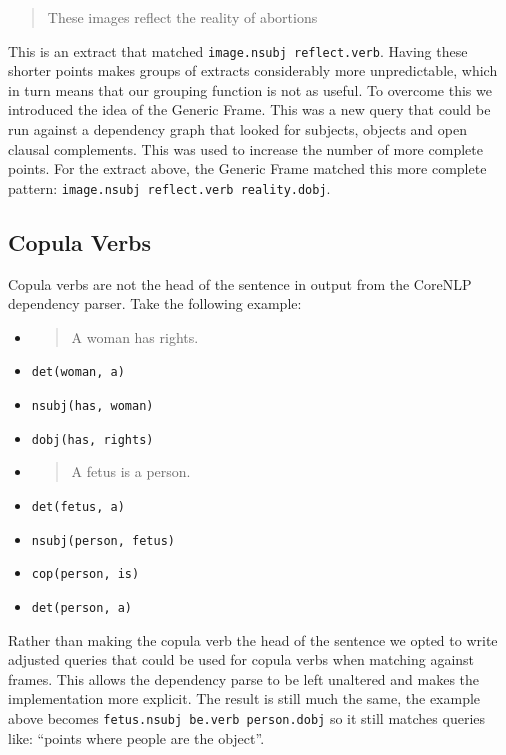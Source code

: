       \blockquote{These images reflect the reality of abortions}

      This is an extract that matched \texttt{image.nsubj reflect.verb}. Having these shorter points makes groups of extracts considerably more unpredictable, which in turn means that our grouping function is not as useful. To overcome this we introduced the idea of the Generic Frame. This was a new query that could be run against a dependency graph that looked for subjects, objects and open clausal complements. This was used to increase the number of more complete points. For the extract above, the Generic Frame matched this more complete pattern: \texttt{image.nsubj reflect.verb reality.dobj}.

    \tocless\subsection{Copula Verbs}
      Copula verbs are not the head of the sentence in output from the CoreNLP dependency parser. Take the following example:
      \begin{multicols}{2}
        \raggedcolumns
        \begin{itemize}[label={}]
          \item{\blockquote{A woman has rights.}}
          \item{\texttt{det(woman, a)}}
          \item{\texttt{nsubj(has, woman)}}
          \item{\texttt{dobj(has, rights)}}
        \end{itemize}
        \columnbreak
        \begin{itemize}[label={}]
          \item{\blockquote{A fetus is a person.}}
          \item{\texttt{det(fetus, a)}}
          \item{\texttt{nsubj(person, fetus)}}
          \item{\texttt{cop(person, is)}}
          \item{\texttt{det(person, a)}}
        \end{itemize}
      \end{multicols}

      Rather than making the copula verb the head of the sentence we opted to write adjusted queries that could be used for copula verbs when matching against frames. This allows the dependency parse to be left unaltered and makes the implementation more explicit. The result is still much the same, the example above becomes \texttt{fetus.nsubj be.verb person.dobj} so it still matches queries like: ``points where people are the object''.

